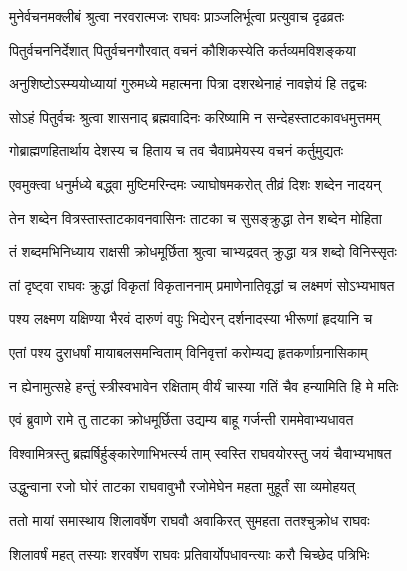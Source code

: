 
\twolineshloka
{मुनेर्वचनमक्लीबं श्रुत्वा नरवरात्मजः}
{राघवः प्राञ्जलिर्भूत्वा प्रत्युवाच दृढव्रतः} %

\twolineshloka
{पितुर्वचननिर्देशात् पितुर्वचनगौरवात्}
{वचनं कौशिकस्येति कर्तव्यमविशङ्कया} %

\twolineshloka
{अनुशिष्टोऽस्म्ययोध्यायां गुरुमध्ये महात्मना}
{पित्रा दशरथेनाहं नावज्ञेयं हि तद्वचः} %

\twolineshloka
{सोऽहं पितुर्वचः श्रुत्वा शासनाद् ब्रह्मवादिनः}
{करिष्यामि न सन्देहस्ताटकावधमुत्तमम्} %

\twolineshloka
{गोब्राह्मणहितार्थाय देशस्य च हिताय च}
{तव चैवाप्रमेयस्य वचनं कर्तुमुद्यतः} %

\twolineshloka
{एवमुक्त्वा धनुर्मध्ये बद्ध्वा मुष्टिमरिन्दमः}
{ज्याघोषमकरोत् तीव्रं दिशः शब्देन नादयन्} %

\twolineshloka
{तेन शब्देन वित्रस्तास्ताटकावनवासिनः}
{ताटका च सुसङ्क्रुद्धा तेन शब्देन मोहिता} %

\twolineshloka
{तं शब्दमभिनिध्याय राक्षसी क्रोधमूर्छिता}
{श्रुत्वा चाभ्यद्रवत् क्रुद्धा यत्र शब्दो विनिस्सृतः} %

\twolineshloka
{तां दृष्ट्वा राघवः क्रुद्धां विकृतां विकृताननाम्}
{प्रमाणेनातिवृद्धां च लक्ष्मणं सोऽभ्यभाषत} %

\twolineshloka
{पश्य लक्ष्मण यक्षिण्या भैरवं दारुणं वपुः}
{भिद्येरन् दर्शनादस्या भीरूणां हृदयानि च} %

\twolineshloka
{एतां पश्य दुराधर्षां मायाबलसमन्विताम्}
{विनिवृत्तां करोम्यद्य हृतकर्णाग्रनासिकाम्} %

\twolineshloka
{न ह्येनामुत्सहे हन्तुं स्त्रीस्वभावेन रक्षिताम्}
{वीर्यं चास्या गतिं चैव हन्यामिति हि मे मतिः} %

\twolineshloka
{एवं ब्रुवाणे रामे तु ताटका क्रोधमूर्छिता}
{उद्यम्य बाहू गर्जन्ती राममेवाभ्यधावत} %

\twolineshloka
{विश्वामित्रस्तु ब्रह्मर्षिर्हुङ्कारेणाभिभर्त्स्य ताम्}
{स्वस्ति राघवयोरस्तु जयं चैवाभ्यभाषत} %

\twolineshloka
{उद्धुन्वाना रजो घोरं ताटका राघवावुभौ}
{रजोमेघेन महता मुहूर्तं सा व्यमोहयत्} %

\twolineshloka
{ततो मायां समास्थाय शिलावर्षेण राघवौ}
{अवाकिरत् सुमहता ततश्चुक्रोध राघवः} %

\twolineshloka
{शिलावर्षं महत् तस्याः शरवर्षेण राघवः}
{प्रतिवार्योपधावन्त्याः करौ चिच्छेद पत्रिभिः} %

